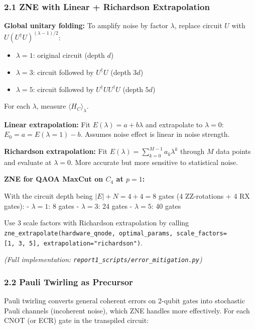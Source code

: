 \documentclass[
  11pt,
]{report}
\providecommand{\tightlist}{%
  \setlength{\itemsep}{0pt}\setlength{\parskip}{0pt}}
\begin{document}
\subsubsection{2.1 ZNE with Linear + Richardson
Extrapolation}\label{zne-with-linear-richardson-extrapolation}

\textbf{Global unitary folding:} To amplify noise by factor \(\lambda\),
replace circuit \(U\) with \(U(U^\dagger U)^{(\lambda-1)/2}\):

\begin{itemize}
\tightlist
\item
  \(\lambda = 1\): original circuit (depth \(d\))
\item
  \(\lambda = 3\): circuit followed by \(U^\dagger U\) (depth \(3d\))
\item
  \(\lambda = 5\): circuit followed by \(U^\dagger U U^\dagger U\)
  (depth \(5d\))
\end{itemize}

For each \(\lambda\), measure \(\langle H_C \rangle_\lambda\).

\textbf{Linear extrapolation:} Fit \(E(\lambda) = a + b\lambda\) and
extrapolate to \(\lambda = 0\): \(E_0 = a = E(\lambda=1) - b\). Assumes
noise effect is linear in noise strength.

\textbf{Richardson extrapolation:} Fit
\(E(\lambda) = \sum_{k=0}^{M-1} a_k \lambda^k\) through \(M\) data
points and evaluate at \(\lambda = 0\). More accurate but more sensitive
to statistical noise.

\textbf{ZNE for QAOA MaxCut on \(C_4\) at \(p = 1\):}

With the circuit depth being \(|E| + N = 4 + 4 = 8\) gates (4
ZZ-rotations + 4 RX gates): - \(\lambda = 1\): 8 gates -
\(\lambda = 3\): 24 gates - \(\lambda = 5\): 40 gates

Use 3 scale factors with Richardson extrapolation by calling
\texttt{zne\_extrapolate(hardware\_qnode,\ optimal\_params,\ scale\_factors={[}1,\ 3,\ 5{]},\ extrapolation="richardson")}.

\emph{(Full implementation:
\texttt{report1\_scripts/error\_mitigation.py})}

\subsubsection{2.2 Pauli Twirling as
Precursor}\label{pauli-twirling-as-precursor}

Pauli twirling converts general coherent errors on 2-qubit gates into
stochastic Pauli channels (incoherent noise), which ZNE handles more
effectively. For each CNOT (or ECR) gate in the transpiled circuit:
\end{document}
